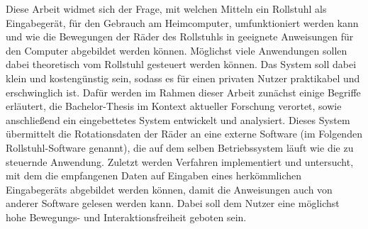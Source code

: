 Diese Arbeit widmet sich der Frage, mit welchen Mitteln ein Rollstuhl als Eingabegerät, für den Gebrauch am Heimcomputer, umfunktioniert werden kann und wie die Bewegungen der Räder des Rollstuhls in geeignete Anweisungen für den Computer abgebildet werden können.
Möglichst viele Anwendungen sollen dabei theoretisch vom Rollstuhl gesteuert werden können.
Das System soll dabei klein und kostengünstig sein, sodass es für einen privaten Nutzer praktikabel und erschwinglich ist.
Dafür werden im Rahmen dieser Arbeit zunächst einige Begriffe erläutert, die Bachelor-Thesis im Kontext aktueller Forschung verortet, sowie anschließend ein eingebettetes System entwickelt und analysiert.
Dieses System übermittelt die Rotationsdaten der Räder an eine externe Software (im Folgenden Rollstuhl-Software genannt), die auf dem selben Betriebssystem läuft wie die zu steuernde Anwendung.
Zuletzt werden Verfahren implementiert und untersucht, mit dem die empfangenen Daten auf Eingaben eines herkömmlichen Eingabegeräts abgebildet werden können, damit die Anweisungen auch von anderer Software gelesen werden kann.
Dabei soll dem Nutzer eine möglichst hohe Bewegungs- und Interaktionsfreiheit geboten sein.
